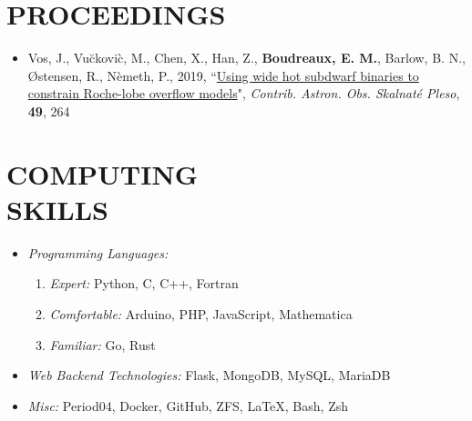 \documentclass[margin, 10pt]{res} %
\begin{document}
\begin{resume}
\section{PROCEEDINGS}
\begin{itemize}
\item Vos, J., Vu\u{c}kovi\`c, M., Chen, X., Han, Z., \textbf{Boudreaux, E. M.}, Barlow, B. N., \O stensen, R., N\`emeth, P., 2019, ``\href{http://www.ta3.sk/caosp/Eedition/FullTexts/vol49no2/pp264-270.pdf}{Using wide hot subdwarf binaries to constrain Roche-lobe overflow models}", \textit{Contrib. Astron. Obs. Skalnaté Pleso}, \textbf{49}, 264 
\end{itemize}

\section{COMPUTING \\ SKILLS} 

\begin{itemize}
\item {\sl Programming Languages:} 
    \begin{enumerate}
        \item{\sl Expert: } Python, C, C++, Fortran
        \item{\sl Comfortable: } Arduino, PHP, JavaScript, Mathematica
        \item{\sl Familiar: } Go, Rust 
    \end{enumerate}
\item {\sl Web Backend Technologies:} Flask, MongoDB, MySQL, MariaDB
\item {\sl Misc:} Period04, Docker, GitHub, ZFS, LaTeX, Bash, Zsh
\end{itemize}
 
 



\end{resume}
\end{document}
